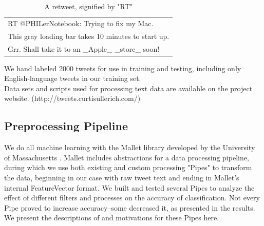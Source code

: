 \documentclass[letterpaper]{article}
\begin{document}
\begin{table}[h]
\centering
\begin{tabular}{|l|}
	\hline
	RT @PHILerNotebook: Trying to fix my Mac. \\ This gray loading bar takes 10 minutes to start up. \\ Grr. Shall take it to an \_Apple\_ \_store\_ soon! \\
	\hline
\end{tabular}
\caption{A retweet, signified by "RT"}
\end{table}

We hand labeled 2000 tweets for use in training and testing, including only English-language tweets in our training set. \\
Data sets and scripts used for processing text data are available on the project website. (http://tweets.curtisullerich.com/)\\

\subsection{Preprocessing Pipeline}

We do all machine learning with the Mallet library developed by the University of Massachusetts \cite{McCallumMALLET}. Mallet includes abstractions for a data processing pipeline, during which we use both existing and custom processing "Pipes" to transform the data, beginning in our case with raw tweet text and ending in Mallet's internal FeatureVector format. We built and tested several Pipes to analyze the effect of different filters and processes on the accuracy of classification. Not every Pipe proved to increase accuracy--some decreased it, as presented in the results. We present the descriptions of and motivations for these Pipes here.
\end{document}
